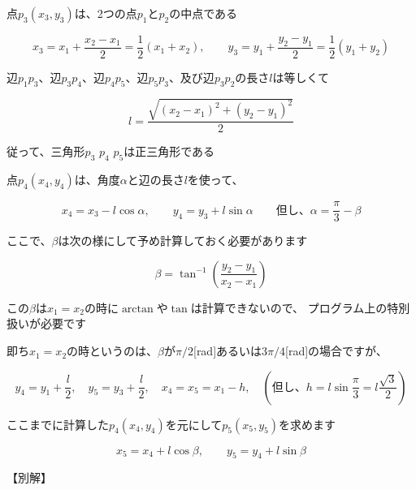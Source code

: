 \documentclass[uplatex,a4paper,11pt,oneside,openany]{jsbook}
\begin{document}
点$p_3(x_3,y_3)$は、2つの点$p_1$と$p_2$の中点である

\begin{equation}
  x_3=x_1+\frac{x_2-x_1}{2}=\frac{1}{2}(x_1+x_2), \qquad y_3=y_1+\frac{y_2-y_1}{2}=\frac{1}{2}(y_1+y_2)
\end{equation}

辺$p_1p_3$、辺$p_3p_4$、辺$p_4p_5$、辺$p_5p_3$、及び辺$p_3p_2$の長さ$l$は等しくて

\begin{equation*}
  l=\frac{\sqrt{(x_2-x_1)^2+(y_2-y_1)^2}}{2}
\end{equation*}

従って、三角形$p_3$ $p_4$ $p_5$は正三角形である

点$p_4(x_4,y_4)$は、角度$\alpha$と辺の長さ$l$を使って、

\begin{equation}
  x_4=x_3-l\cos\alpha, \qquad y_4=y_3+l\sin\alpha \qquad 但し、\alpha=\frac{\pi}{3}-\beta
\end{equation}

ここで、$\beta$は次の様にして予め計算しておく必要があります

\begin{equation*}
  \beta=\tan^{-1}\left(\frac{y_2-y_1}{x_2-x_1}\right)
\end{equation*}

この$\beta$は$x_1=x_2$の時に$\arctan$や$\tan$は計算できないので、
プログラム上の特別扱いが必要です

即ち$x_1=x_2$の時というのは、$\beta$が$\pi/2$[rad]あるいは$3\pi/4$[rad]の場合ですが、

\begin{equation*}
  y_4=y_1+\frac{l}{2}, \quad y_5=y_3+\frac{l}{2}, \quad x_4=x_5=x_1-h, \quad (但し、h=l\sin\frac{\pi}{3}=l\frac{\sqrt{3}}{2})
\end{equation*}

ここまでに計算した$p_4(x_4,y_4)$を元にして$p_5(x_5,y_5)$を求めます

\begin{equation}
  x_5=x_4+l\cos\beta, \qquad y_5=y_4+l\sin\beta
\end{equation}

\newpage

【別解】



%
\end{document}
